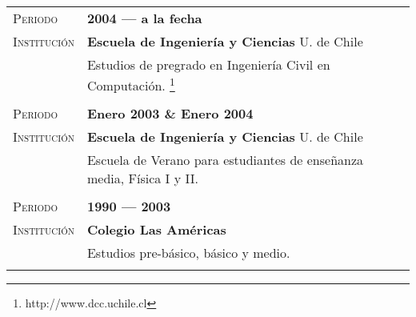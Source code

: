 \documentclass[letterpaper, oneside, final, 12pt]{scrartcl}
\newcommand{\gray}{\rowcolor[gray]{.90}}
\begin{document}
\begin{center}
\begin{tabularx}{0.97\linewidth}{>{\raggedleft\scshape}p{2.5cm}X}
\gray	Periodo		& \textbf{2004 --- a la fecha} \\
\gray	Instituci\'on	& \textbf{Escuela de Ingenier\'ia y Ciencias} \hfill U. de Chile \\
					& Estudios de pregrado en Ingenier\'ia Civil en Computaci\'on. \footnote{http://www.dcc.uchile.cl} \\
					& \\
\gray	Periodo		& \textbf{Enero 2003 \& Enero 2004} \\
\gray	Instituci\'on	& \textbf{Escuela de Ingenier\'ia y Ciencias} \hfill U. de Chile \\
					& Escuela de Verano para estudiantes de ense\~nanza media, F\'isica I y II. \\
					& \\
\gray	Periodo		& \textbf{1990 --- 2003} \\
\gray	Instituci\'on	& \textbf{Colegio Las Am\'ericas} \\
					& Estudios pre-b\'asico, b\'asico y medio. \\
					& \\
\end{tabularx}

%
%
%
%
%

\end{center}
\end{document}

